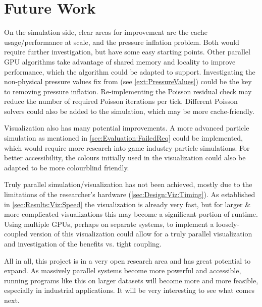 \section{Future Work}

On the simulation side, clear areas for improvement are the cache usage/performance at scale, and the pressure inflation problem.
Both would require further investigation, but have some easy starting points.
Other parallel GPU algorithms take advantage of shared memory and locality to improve performance, which the algorithm could be adapted to support.
Investigating the non-physical pressure values fix from \cite{book:griebel1998numerical} (see \cref{ext:PressureValues}) could be the key to removing pressure inflation.
Re-implementing the Poisson residual check may reduce the number of required Poisson iterations per tick.
Different Poisson solvers could also be added to the simulation, which may be more cache-friendly.

Visualization also has many potential improvements.
A more advanced particle simulation as mentioned in \cref{sec:Evaluation:FailedReq} could be implemented, which would require more research into game industry particle simulations.
For better accessibility, the colours initially used in the visualization could also be adapted to be more colourblind friendly.

Truly parallel simulation/visualization has not been achieved, mostly due to the limitations of the researcher's hardware (\cref{sec:Design:Viz:Timing}).
As established in \cref{sec:Results:Viz:Speed} the visualization is already very fast, but for larger \& more complicated visualizations this may become a significant portion of runtime.
Using multiple GPUs, perhaps on separate systems, to implement a loosely-coupled version of this visualization could allow for a truly parallel visualization and investigation of the benefits vs. tight coupling.

All in all, this project is in a very open research area and has great potential to expand.
As massively parallel systems become more powerful and accessible, running programs like this on larger datasets will become more and more feasible, especially in industrial applications.
It will be very interesting to see what comes next.
